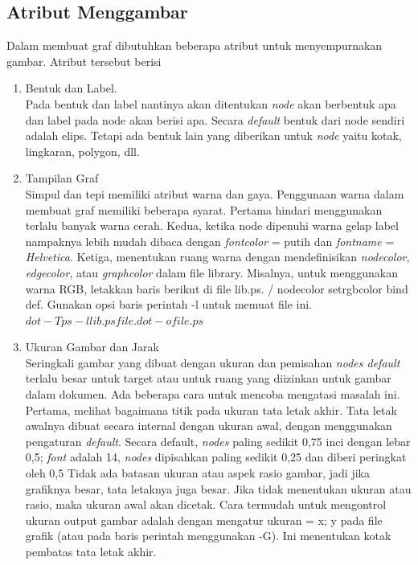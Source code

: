 \subsection{Atribut Menggambar}
\label{sec: Atribut Menggambar}
Dalam membuat graf dibutuhkan beberapa atribut untuk menyempurnakan gambar. Atribut tersebut berisi 
\begin{enumerate}
\item Bentuk dan Label.\\
Pada bentuk dan label nantinya akan ditentukan \textit{node} akan berbentuk apa dan label pada node akan berisi apa. Secara \textit{default} bentuk dari node sendiri adalah elips. Tetapi ada bentuk lain yang diberikan untuk \textit{node} yaitu kotak, lingkaran, polygon, dll. 
\item Tampilan Graf\\
Simpul dan tepi memiliki atribut warna dan gaya. Penggunaan warna dalam membuat graf memiliki beberapa syarat. Pertama hindari menggunakan terlalu banyak warna cerah. Kedua, ketika node dipenuhi warna gelap label nampaknya lebih mudah dibaca dengan \textit{fontcolor} = putih dan \textit{fontname} = \textit{Helvetica}. Ketiga, menentukan ruang warna dengan mendefinisikan \textit{nodecolor}, \textit{edgecolor}, atau \textit{graphcolor} dalam file library. Misalnya, untuk menggunakan warna RGB, letakkan baris berikut di file lib.ps. / nodecolor {setrgbcolor} bind def. Gunakan opsi baris perintah -l untuk memuat file ini. $ dot -Tps -l lib.ps file.dot -o file.ps $
\item Ukuran Gambar dan Jarak\\
Seringkali gambar yang dibuat dengan ukuran dan pemisahan \textit{nodes default} terlalu besar untuk target atau untuk ruang yang diizinkan untuk gambar dalam dokumen. Ada beberapa cara untuk mencoba mengatasi masalah ini. Pertama, melihat bagaimana titik pada ukuran tata letak akhir. Tata letak awalnya dibuat secara internal dengan ukuran awal, dengan menggunakan pengaturan \textit{default}. Secara default, \textit{nodes} paling sedikit 0,75 inci dengan lebar 0,5; \textit{font} adalah 14, \textit{nodes} dipisahkan paling sedikit 0,25 dan diberi peringkat oleh 0,5 Tidak ada batasan ukuran atau aspek rasio gambar, jadi jika grafiknya besar, tata letaknya juga besar. Jika tidak menentukan ukuran atau rasio, maka ukuran awal akan dicetak. Cara termudah untuk mengontrol ukuran output gambar adalah dengan mengatur ukuran = x; y pada file grafik (atau pada baris perintah menggunakan -G). Ini menentukan kotak pembatas tata letak akhir. 


\end{enumerate}
